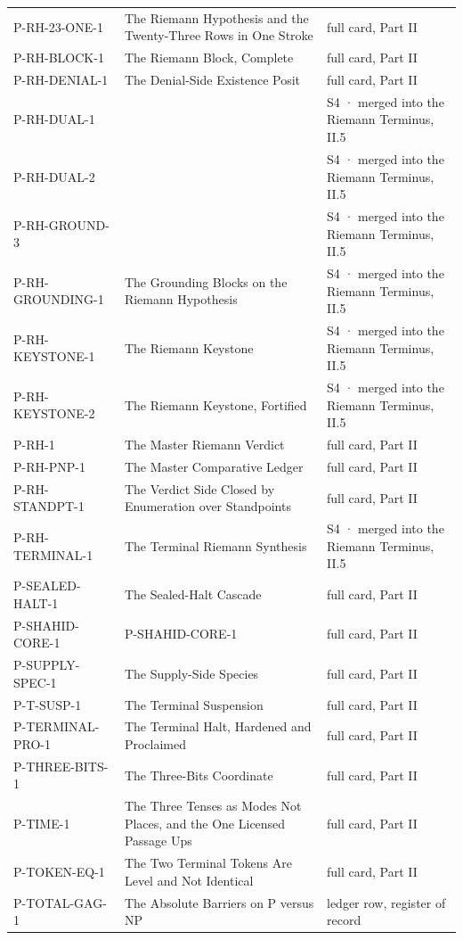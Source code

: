 \documentclass[10pt,twocolumn]{article}
\begin{document}
\begin{center}
\begin{longtable}{>{\raggedright\arraybackslash}p{}>{\raggedright\arraybackslash}p{}>{\raggedright\arraybackslash}p{}}
P-RH-23-ONE-1 & The Riemann Hypothesis and the Twenty-Three Rows in One Stroke & full card, Part II \\
P-RH-BLOCK-1 & The Riemann Block, Complete & full card, Part II \\
P-RH-DENIAL-1 & The Denial-Side Existence Posit & full card, Part II \\
P-RH-DUAL-1 &  & S4 · merged into the Riemann Terminus, II.5 \\
P-RH-DUAL-2 &  & S4 · merged into the Riemann Terminus, II.5 \\
P-RH-GROUND-3 &  & S4 · merged into the Riemann Terminus, II.5 \\
P-RH-GROUNDING-1 & The Grounding Blocks on the Riemann Hypothesis & S4 · merged into the Riemann Terminus, II.5 \\
P-RH-KEYSTONE-1 & The Riemann Keystone & S4 · merged into the Riemann Terminus, II.5 \\
P-RH-KEYSTONE-2 & The Riemann Keystone, Fortified & S4 · merged into the Riemann Terminus, II.5 \\
P-RH-1 & The Master Riemann Verdict & full card, Part II \\
P-RH-PNP-1 & The Master Comparative Ledger & full card, Part II \\
P-RH-STANDPT-1 & The Verdict Side Closed by Enumeration over Standpoints & full card, Part II \\
P-RH-TERMINAL-1 & The Terminal Riemann Synthesis & S4 · merged into the Riemann Terminus, II.5 \\
P-SEALED-HALT-1 & The Sealed-Halt Cascade & full card, Part II \\
P-SHAHID-CORE-1 & [codex home: §IV/§XVIII] P-SHAHID-CORE-1 & full card, Part II \\
P-SUPPLY-SPEC-1 & The Supply-Side Species & full card, Part II \\
P-T-SUSP-1 & The Terminal Suspension & full card, Part II \\
P-TERMINAL-PRO-1 & The Terminal Halt, Hardened and Proclaimed & full card, Part II \\
P-THREE-BITS-1 & The Three-Bits Coordinate & full card, Part II \\
P-TIME-1 & The Three Tenses as Modes Not Places, and the One Licensed Passage Ups & full card, Part II \\
P-TOKEN-EQ-1 & The Two Terminal Tokens Are Level and Not Identical & full card, Part II \\
P-TOTAL-GAG-1 & The Absolute Barriers on P versus NP & ledger row, register of record \\

\end{longtable}
\end{center}
\end{document}
